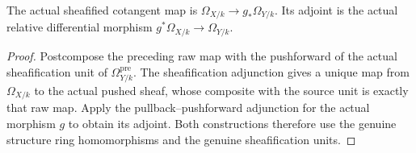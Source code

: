 \begin{definition}\label{sc0-cotangent-morphism:sheaf}
\leanok
{}
The actual sheafified cotangent map is $\Omega_{X/k}\to g_*\Omega_{Y/k}$. Its adjoint is the actual relative differential morphism $g^*\Omega_{X/k}\to\Omega_{Y/k}$.
\end{definition}
\begin{proof}
Postcompose the preceding raw map with the pushforward of the actual sheafification unit of $\Omega^{\mathrm{pre}}_{Y/k}$. The sheafification adjunction gives a unique map from $\Omega_{X/k}$ to the actual pushed sheaf, whose composite with the source unit is exactly that raw map. Apply the pullback--pushforward adjunction for the actual morphism $g$ to obtain its adjoint. Both constructions therefore use the genuine structure ring homomorphisms and the genuine sheafification units.
\end{proof}
